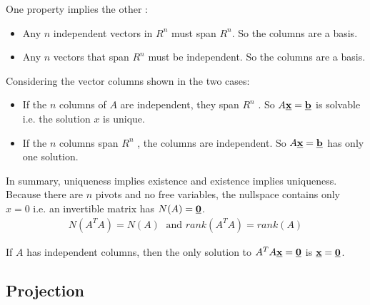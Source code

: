 \documentclass[10pt,a4paper]{article}
\begin{document}
\begin{tcolorbox}[breakable,colback=white]
    One property implies the other : 
    \begin{itemize}
        \item Any $n$ independent vectors in $R^n$  must span $R^n$. So the columns are a basis.
        \item Any $n$ vectors that span $R^n$  must be independent. So the columns are a basis. 
    \end{itemize} 
\end{tcolorbox}

\pagebreak

Considering the vector columns shown in the two cases:
\begin{itemize}
    \item If the $n$ columns of $A$ are independent, they span $R^n$ . So $A \textbf{\underline{x}}
    = \textbf{\underline{b}}$ is solvable i.e. the solution $x$ is unique.
    \item If the $n$ columns span $R^n$ , the columns are independent. So $A \textbf{\underline{x}} = \textbf{\underline{b}}$ has only one solution. 
\end{itemize}
In summary, uniqueness implies existence and existence implies uniqueness. Because there are $n$
pivots and no free variables, the nullspace contains only $x = 0$ i.e. an invertible matrix has $N(A) = \textbf{\underline{0}}$.
\begin{align*}
    N(A^T A) = N(A) \; \text{ and } rank(A^T A) = rank(A)
\end{align*}

If $A$ has independent columns, then the only solution to $A^T A\textbf{\underline{x}} =
\textbf{\underline{0}}$ is $\textbf{\underline{x}}=\textbf{\underline{0}}$.

\subsection{Projection}
\end{document}
